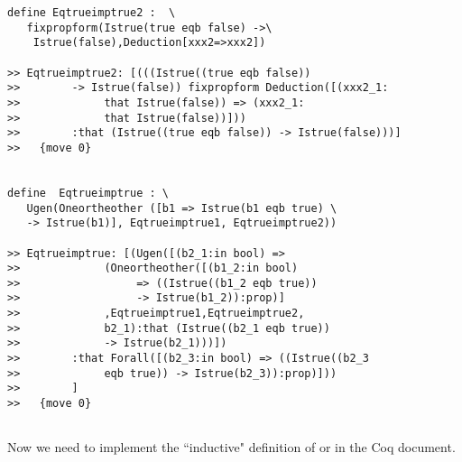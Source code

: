 \documentclass[12pt]{article}
\begin{document}
\begin{verbatim}
define Eqtrueimptrue2 :  \
   fixpropform(Istrue(true eqb false) ->\
    Istrue(false),Deduction[xxx2=>xxx2])

>> Eqtrueimptrue2: [(((Istrue((true eqb false)) 
>>        -> Istrue(false)) fixpropform Deduction([(xxx2_1:
>>             that Istrue(false)) => (xxx2_1:
>>             that Istrue(false))]))
>>        :that (Istrue((true eqb false)) -> Istrue(false)))]
>>   {move 0}


define  Eqtrueimptrue : \
   Ugen(Oneortheother ([b1 => Istrue(b1 eqb true) \
   -> Istrue(b1)], Eqtrueimptrue1, Eqtrueimptrue2))

>> Eqtrueimptrue: [(Ugen([(b2_1:in bool) => 
>>             (Oneortheother([(b1_2:in bool) 
>>                  => ((Istrue((b1_2 eqb true)) 
>>                  -> Istrue(b1_2)):prop)]
>>             ,Eqtrueimptrue1,Eqtrueimptrue2,
>>             b2_1):that (Istrue((b2_1 eqb true)) 
>>             -> Istrue(b2_1)))])
>>        :that Forall([(b2_3:in bool) => ((Istrue((b2_3 
>>             eqb true)) -> Istrue(b2_3)):prop)]))
>>        ]
>>   {move 0}


\end{verbatim}

Now we need to implement the ``inductive" definition of or in the Coq document.
\end{document}
